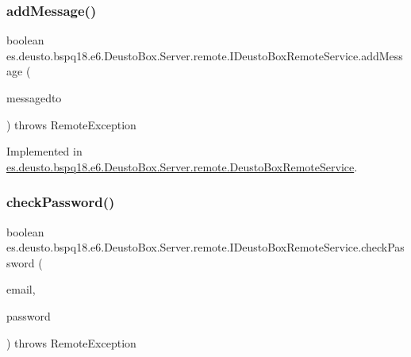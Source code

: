 \subsubsection{\texorpdfstring{add\+Message()}{addMessage()}}
{\footnotesize\ttfamily boolean es.\+deusto.\+bspq18.\+e6.\+Deusto\+Box.\+Server.\+remote.\+I\+Deusto\+Box\+Remote\+Service.\+add\+Message (\begin{DoxyParamCaption}\item[{\mbox{\hyperlink{classes_1_1deusto_1_1bspq18_1_1e6_1_1_deusto_box_1_1_server_1_1dto_1_1_d_message_d_t_o}{D\+Message\+D\+TO}}}]{messagedto }\end{DoxyParamCaption}) throws Remote\+Exception}



Implemented in \mbox{\hyperlink{classes_1_1deusto_1_1bspq18_1_1e6_1_1_deusto_box_1_1_server_1_1remote_1_1_deusto_box_remote_service_a107c5402a09f6de5482dd66967751439}{es.\+deusto.\+bspq18.\+e6.\+Deusto\+Box.\+Server.\+remote.\+Deusto\+Box\+Remote\+Service}}.

\mbox{\label{interfacees_1_1deusto_1_1bspq18_1_1e6_1_1_deusto_box_1_1_server_1_1remote_1_1_i_deusto_box_remote_service_ade1f67d916a6ad0e9d256aa60c80a8a7}} 
\subsubsection{\texorpdfstring{check\+Password()}{checkPassword()}}
{\footnotesize\ttfamily boolean es.\+deusto.\+bspq18.\+e6.\+Deusto\+Box.\+Server.\+remote.\+I\+Deusto\+Box\+Remote\+Service.\+check\+Password (\begin{DoxyParamCaption}\item[{String}]{email,  }\item[{String}]{password }\end{DoxyParamCaption}) throws Remote\+Exception}



